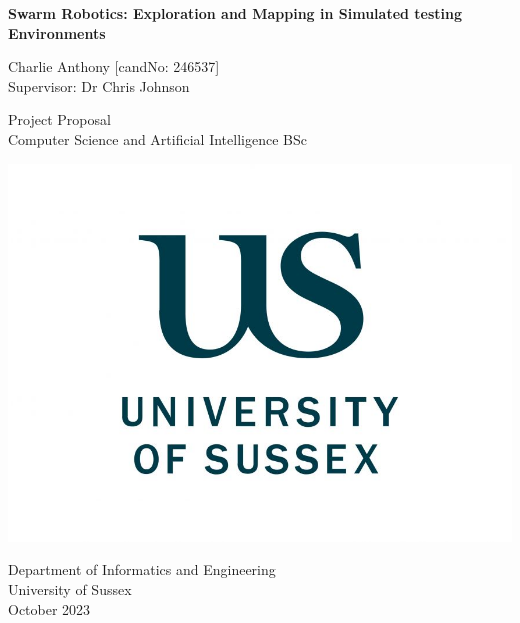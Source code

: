 \documentclass[12pt]{article}
\begin{document}
\begin{titlepage}
    \centering
    \vspace*{5cm}

    \Large
    \textbf{Swarm Robotics: Exploration and Mapping in Simulated testing Environments}

    \vspace{1cm}

    Charlie Anthony [candNo: 246537]\\
    Supervisor: Dr Chris Johnson

    \vfill

    \vspace{1cm}

    \small
    Project Proposal\\
    Computer Science and Artificial Intelligence BSc

    \includegraphics[width=0.3\linewidth]{sussex_logo.jpg} %


    \small
    Department of Informatics and Engineering\\
    University of Sussex\\
    October 2023
\end{titlepage}

\tableofcontents
\newpage
\end{document}
